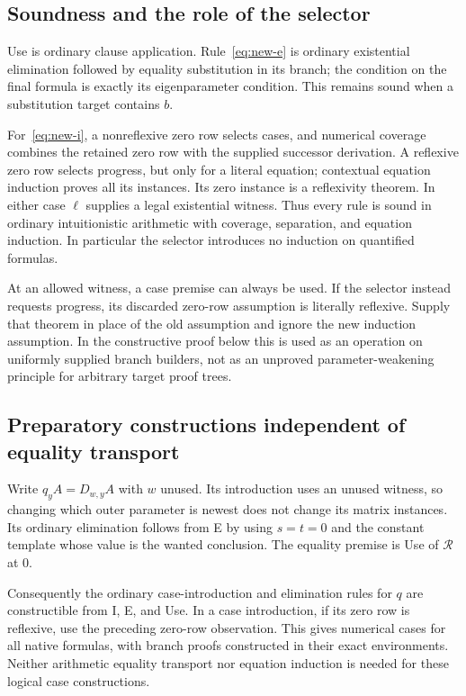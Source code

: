 \documentclass[11pt]{article}
\theoremstyle{definition}\newtheorem{definition}[theorem]{Definition}
\theoremstyle{remark}\newtheorem{remark}[theorem]{Remark}
\begin{document}
\subsection{Soundness and the role of the selector}

Use is ordinary clause application.  Rule~\eqref{eq:new-e} is ordinary
existential elimination followed by equality substitution in its branch;
the condition on the final formula is exactly its eigenparameter condition.
This remains sound when a substitution target contains $b$.

For~\eqref{eq:new-i}, a nonreflexive zero row selects cases, and numerical
coverage combines the retained zero row with the supplied successor
derivation.  A reflexive zero row selects progress, but only for a literal
equation; contextual equation induction proves all its instances.  Its
zero instance is a reflexivity theorem.  In either case $\ell$ supplies
a legal existential witness.  Thus every rule is sound in ordinary
intuitionistic arithmetic with coverage, separation, and equation induction.
In particular the selector introduces no induction on quantified formulas.

At an allowed witness, a case premise can always be used.  If the selector
instead requests progress, its discarded zero-row assumption is literally
reflexive.  Supply that theorem in place of the old assumption and ignore
the new induction assumption.  In the constructive proof below this is
used as an operation on uniformly supplied branch builders, not as an
unproved parameter-weakening principle for arbitrary target proof trees.

\subsection{Preparatory constructions independent of equality transport}

Write $q_yA=D_{w,y}A$ with $w$ unused.  Its introduction uses an unused
witness, so changing which outer parameter is newest does not change its
matrix instances.  Its ordinary elimination follows from E by using
$s=t=0$ and the constant template whose value is the wanted conclusion.
The equality premise is Use of $\mathcal R$ at $0$.

Consequently the ordinary case-introduction and elimination rules for $q$
are constructible from I, E, and Use.  In a case introduction, if its zero
row is reflexive, use the preceding zero-row observation.  This gives
numerical cases for all native formulas, with branch proofs constructed
in their exact environments.  Neither arithmetic equality transport nor
equation induction is needed for these logical case constructions.
\end{document}
